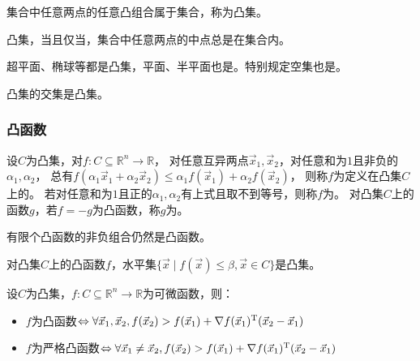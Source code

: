 \begin{definition}[凸集]
    集合中任意两点的任意凸组合属于集合，称为凸集。
\end{definition}

\begin{theorem}[凸集判定]
    凸集，当且仅当，集合中任意两点的中点总是在集合内。
\end{theorem}

超平面、椭球等都是凸集，平面、半平面也是。特别规定空集也是。

\begin{theorem}
    凸集的交集是凸集。
\end{theorem}

\subsubsection{凸函数}

\begin{definition}
    设$C$为凸集，对$f:C\subseteq\mathbb{R}^n\to \mathbb{R}$，
    对任意互异两点$\vec{x}_1,\vec{x}_2$，对任意和为$1$且非负的$\alpha_1,\alpha_2$，
    总有$f(\alpha_1\vec{x}_1+\alpha_2\vec{x}_2)\leq \alpha_1 f(\vec{x}_1)+\alpha_2 f(\vec{x}_2)$，
    则称$f$为定义在凸集$C$上的。
    若对任意和为$1$且正的$\alpha_1,\alpha_2$有上式且取不到等号，则称$f$为。
    对凸集$C$上的函数$g$，若$f=-g$为凸函数，称$g$为。
\end{definition}

\begin{theorem}
    有限个凸函数的非负组合仍然是凸函数。
\end{theorem}

\begin{theorem}
    对凸集$C$上的凸函数$f$，水平集$\{\vec{x}\mid f(\vec{x})\leq \beta, \vec{x}\in C\}$是凸集。
\end{theorem}

\begin{theorem}[凸函数判定]
    设$C$为凸集，$f:C\subseteq\mathbb{R}^n\to\mathbb{R}$为可微函数，则：
    \begin{itemize}
        \item $f$为凸函数$\Leftrightarrow \forall\vec{x}_1,\vec{x}_2,f(\vec{x}_2)>f(\vec{x}_1) + \nabla f(\vec{x}_1)^\mathrm{T} (\vec{x}_2-\vec{x}_1)$
        \item $f$为严格凸函数$\Leftrightarrow \forall\vec{x}_1\neq\vec{x}_2,f(\vec{x}_2)>f(\vec{x}_1) + \nabla f(\vec{x}_1)^\mathrm{T} (\vec{x}_2-\vec{x}_1)$
    \end{itemize}
\end{theorem}

